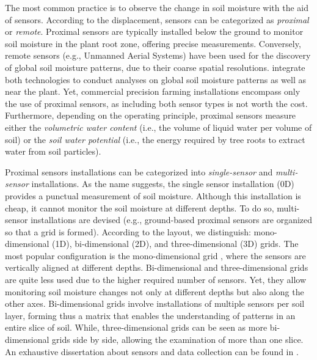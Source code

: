 The most common practice is to observe the change in soil moisture with the aid of sensors.
According to the displacement, sensors can be categorized as \textit{proximal} or \textit{remote}.
Proximal sensors are typically installed below the ground to monitor soil moisture in the plant root zone, offering precise measurements.
Conversely, remote sensors (e.g., Unmanned Aerial Systems) have been used for the discovery of global soil moisture patterns, due to their coarse spatial resolutions.
\cite{Babaeian2021} integrate both technologies to conduct analyses on global soil moisture patterns as well as near the plant.
Yet, commercial precision farming installations encompass only the use of proximal sensors, as including both sensor types is not worth the cost.
Furthermore, depending on the operating principle, proximal sensors measure either the \textit{volumetric water content} (i.e., the volume of liquid water per volume of soil) or the \textit{soil water potential} (i.e., the energy required by tree roots to extract water from soil particles).


Proximal sensors installations can be categorized into \textit{single-sensor} and \textit{multi-sensor} installations.
As the name suggests, the single sensor installation (0D) provides a punctual measurement of soil moisture.
Although this installation \cite{arif2013estimation} is cheap, it cannot monitor the soil moisture at different depths.
To do so, multi-sensor installations are devised (e.g., ground-based proximal sensors are organized so that a grid is formed).
According to the layout, we distinguish: mono-dimensional (1D), bi-dimensional (2D), and three-dimensional (3D) grids.
The most popular configuration is the mono-dimensional grid \cite{Karandish2016892, Goldstein2018421, Jimenez20201327, Pan2021, Li20152382}, where the sensors are vertically aligned at different depths.
Bi-dimensional \cite{Egea2016197, Cordeiro2016139} and three-dimensional \cite{Zapata-Sierra2021, Liang2021} grids are quite less used due to the higher required number of sensors.
Yet, they allow monitoring soil moisture changes not only at different depths but also along the other axes.
Bi-dimensional grids involve installations of multiple sensors per soil layer, forming thus a matrix that enables the understanding of patterns in an entire slice of soil.
While, three-dimensional grids can be seen as more bi-dimensional grids side by side, allowing the examination of more than one slice.
An exhaustive dissertation about sensors and data collection can be found in \cite{vitali2021crop}.

